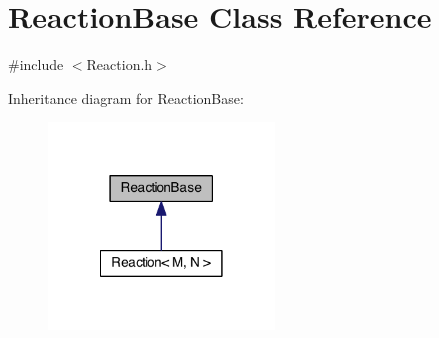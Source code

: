 \hypertarget{classReactionBase}{\section{Reaction\-Base Class Reference}
\label{classReactionBase}
}


{\ttfamily \#include $<$Reaction.\-h$>$}



Inheritance diagram for Reaction\-Base\-:
\nopagebreak
\begin{figure}[H]
\begin{center}
\leavevmode
\includegraphics[width=170pt]{classReactionBase__inherit__graph}
\end{center}
\end{figure}
